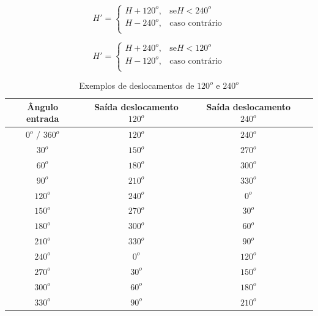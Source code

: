 \documentclass[	12pt, Times, openright, twoside, a4paper, english, brazil]{abntex2}
\begin{document}
\begin{equation}
\label{eq:deslocarH120}
H'=\left\{
\begin{array}{rl}
       H + 120^o,   &\mbox{se}  H < 240^o \\
       H - 240^o,   &\mbox{caso contrário} \\
\end{array}\right.
\end{equation}

\begin{equation}
\label{eq:deslocarH240}
H'=\left\{
\begin{array}{rl}
       H + 240^o,   &\mbox{se}  H < 120^o \\
       H - 120^o,   &\mbox{caso contrário} \\
\end{array}\right.
\end{equation}

\begin{table}[ht]
\centering
\begin{tabular}{cccc}
\hline      

\textbf{Ângulo entrada} & \textbf{Saída deslocamento $120^o$} & \textbf{Saída deslocamento $240^o$}     \\ \hline
$0^o$ / $360^o$         & $120^o$                       &  $240^o$                          \\ \hline
$30^o$                  & $150^o$                       &  $270^o$                          \\ \hline
$60^o$                  & $180^o$                       &  $300^o$                          \\ \hline
$90^o$                  & $210^o$                       &  $330^o$                          \\ \hline
$120^o$                 & $240^o$                       &  $0^o$                            \\ \hline
$150^o$                 & $270^o$                       &  $30^o$                           \\ \hline
$180^o$                 & $300^o$                       &  $60^o$                           \\ \hline
$210^o$                 & $330^o$                       &  $90^o$                           \\ \hline
$240^o$                 & $0^o$                         &  $120^o$                          \\ \hline
$270^o$                 & $30^o$                        &  $150^o$                          \\ \hline
$300^o$                 & $60^o$                        &  $180^o$                          \\ \hline
$330^o$                 & $90^o$                        &  $210^o$                          \\ \hline

\end{tabular}
\caption{Exemplos de deslocamentos de $120^o$ e $240^o$}
\label{tab:exemplosDeslocamento}
\end{table}
\end{document}
